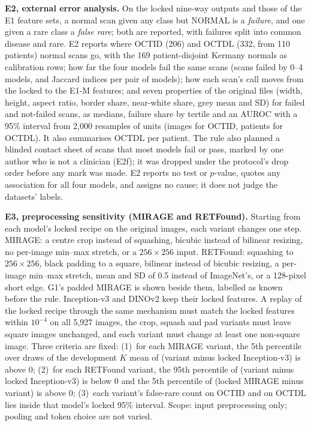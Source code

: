 \documentclass[conference]{IEEEtran}
\begin{document}
\textbf{E2, external error analysis.} On the locked nine-way outputs and those of the E1 feature sets, a normal scan given any class but NORMAL is a \emph{failure}, and one given a rare class a \emph{false rare}; both are reported, with failures split into common disease and rare. E2 reports where OCTID (206) and OCTDL (332, from 110 patients) normal scans go, with the 169 patient-disjoint Kermany normals as calibration rows; how far the four models fail the same scans (scans failed by 0--4 models, and Jaccard indices per pair of models); how each scan's call moves from the locked to the E1-M features; and seven properties of the original files (width, height, aspect ratio, border share, near-white share, grey mean and SD) for failed and not-failed scans, as medians, failure share by tertile and an AUROC with a 95\% interval from 2,000 resamples of units (images for OCTID, patients for OCTDL). It also summarises OCTDL per patient. The rule also planned a blinded contact sheet of scans that most models fail or pass, marked by one author who is not a clinician (E2f); it was dropped under the protocol's drop order before any mark was made. E2 reports no test or $p$-value, quotes any association for all four models, and assigns no cause; it does not judge the datasets' labels.

\textbf{E3, preprocessing sensitivity (MIRAGE and RETFound).} Starting from each model's locked recipe on the original images, each variant changes one step. MIRAGE: a centre crop instead of squashing, bicubic instead of bilinear resizing, no per-image min--max stretch, or a $256\times256$ input. RETFound: squashing to $256\times256$, black padding to a square, bilinear instead of bicubic resizing, a per-image min--max stretch, mean and SD of 0.5 instead of ImageNet's, or a 128-pixel short edge. G1's padded MIRAGE is shown beside them, labelled as known before the rule. Inception-v3 and DINOv2 keep their locked features. A replay of the locked recipe through the same mechanism must match the locked features within $10^{-4}$ on all 5,927 images, the crop, squash and pad variants must leave square images unchanged, and each variant must change at least one non-square image. Three criteria are fixed: (1)~for each MIRAGE variant, the 5th percentile over draws of the development $K$ mean of (variant minus locked Inception-v3) is above 0; (2)~for each RETFound variant, the 95th percentile of (variant minus locked Inception-v3) is below 0 and the 5th percentile of (locked MIRAGE minus variant) is above 0; (3)~each variant's false-rare count on OCTID and on OCTDL lies inside that model's locked 95\% interval. Scope: input preprocessing only; pooling and token choice are not varied.
\end{document}

